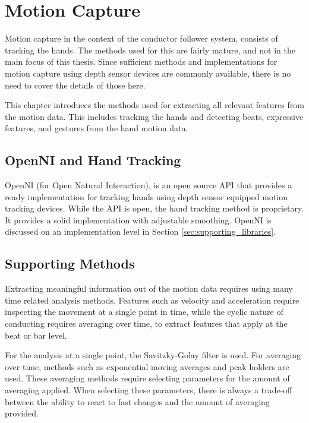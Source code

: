\chapter{Motion Capture}
\label{chapter:motion_capture}

Motion capture in the context of the conductor follower system,
consists of tracking the hands.
The methods used for this are fairly mature,
and not in the main focus of this thesis.
Since sufficient methods and implementations for
motion capture using depth sensor devices
are commonly available,
there is no need to cover the details of those here.


This chapter introduces the methods used for
extracting all relevant features from the motion data.
This includes tracking the hands and
detecting beats, expressive features,
and gestures from the hand motion data.

\section{OpenNI and Hand Tracking}

OpenNI (for Open Natural Interaction),
is an open source API that provides
a ready implementation for tracking hands
using depth sensor equipped motion tracking devices.
While the API is open, 
the hand tracking method is proprietary.
It provides a solid implementation
with adjustable smoothing.
OpenNI is discussed on an implementation level in Section
\ref{sec:supporting_libraries}.

\section{Supporting Methods}

Extracting meaningful information out of the motion data
requires using many time related analysis methods.
Features such as velocity and acceleration
require inspecting the movement at a single point in time,
while the cyclic nature of conducting requires
averaging over time, to extract features that apply
at the beat or bar level.

For the analysis at a single point,
the Savitzky-Golay filter \cite{savitzky1964} is used.
For averaging over time, methods such as
exponential moving averages and peak holders are used.
These averaging methods require selecting 
parameters for the amount of averaging applied.
When selecting these parameters,
there is always a trade-off between the 
ability to react to fast changes
and the amount of averaging provided.

